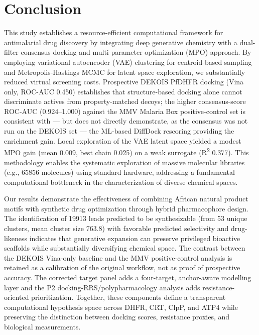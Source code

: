 \documentclass[journal=jcisd8,manuscript=article]{achemso}
\begin{document}
\section{Conclusion}

This study establishes a resource-efficient computational framework for antimalarial drug discovery by integrating deep generative chemistry with a dual-filter
consensus docking and multi-parameter optimization (MPO) approach. By employing variational autoencoder (VAE) clustering for centroid-based sampling and
Metropolis-Hastings MCMC for latent space exploration, we substantially reduced virtual screening costs. Prospective DEKOIS PfDHFR docking (Vina only, ROC-AUC
\num{0.450}) establishes that structure-based docking alone cannot discriminate actives from property-matched decoys; the higher consensus-score ROC-AUC
(\numrange{0.924}{1.000}) against the MMV Malaria Box positive-control set is consistent with --- but does not directly demonstrate, as the consensus was not
run on the DEKOIS set --- the ML-based DiffDock rescoring providing the enrichment gain. Local exploration of the VAE latent space yielded a modest MPO gain
(mean \num{+0.009}, best chain \num{+0.025}) on a weak surrogate (R\textsuperscript{2} \num{0.377}). This methodology enables the systematic exploration of
massive molecular libraries (e.g., \num{65856} molecules) using standard hardware, addressing a fundamental computational bottleneck in the characterization of
diverse chemical spaces.

Our results demonstrate the effectiveness of combining African natural product motifs with synthetic drug optimization through hybrid pharmacophore design. The
identification of \num{19913} leads predicted to be synthesizable (from \num{53} unique clusters, mean cluster size \num{763.8}) with favorable predicted
selectivity and drug-likeness indicates that generative expansion can preserve privileged bioactive scaffolds while substantially diversifying chemical space.
The contrast between the DEKOIS Vina-only baseline and the MMV positive-control analysis is retained as a calibration of the original workflow, not as proof of prospective accuracy. The corrected target panel adds a four-target, anchor-aware modelling layer and the P2 docking-RRS/polypharmacology analysis adds resistance-oriented prioritization. Together, these components define a transparent computational hypothesis space across DHFR, CRT, ClpP, and ATP4 while preserving the distinction between docking scores, resistance proxies, and biological measurements.
\end{document}
